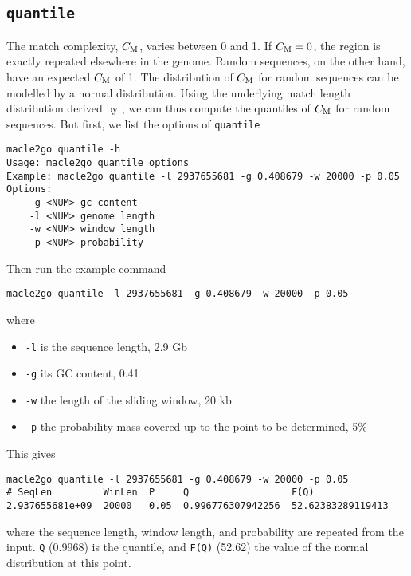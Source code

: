 \documentclass[a4paper]{article}
\newcommand{\ty}{\texttt}
\newcommand{\cm}{C_{\rm M}}
\begin{document}
\subsection{\ty{quantile}} The match complexity, $\cm$, varies between 0 and 1. If $\cm=0$, the region is
exactly repeated elsewhere in the genome. Random sequences, on the
other hand, have an expected $\cm$ of 1. The distribution of $\cm$ for
random sequences can be modelled by a normal distribution. Using the
underlying match length distribution derived by \cite{hau09:est}, we
can thus 
compute the quantiles of $\cm$ for random sequences. But first, we list the options of \ty{quantile}
\begin{lstlisting}
macle2go quantile -h
Usage: macle2go quantile options
Example: macle2go quantile -l 2937655681 -g 0.408679 -w 20000 -p 0.05
Options:
	-g <NUM> gc-content
	-l <NUM> genome length
	-w <NUM> window length
	-p <NUM> probability
\end{lstlisting}
Then run the example command
\begin{verbatim}
macle2go quantile -l 2937655681 -g 0.408679 -w 20000 -p 0.05
\end{verbatim}
where
\begin{itemize}
\item \ty{-l} is the sequence length, 2.9 Gb
\item \ty{-g} its GC content, 0.41
\item \ty{-w} the length of the sliding window, 20 kb
\item \ty{-p} the probability mass covered up to the point to be determined, 5\%
\end{itemize}
This gives
\begin{verbatim}
macle2go quantile -l 2937655681 -g 0.408679 -w 20000 -p 0.05
# SeqLen         WinLen  P     Q                  F(Q)
2.937655681e+09  20000   0.05  0.996776307942256  52.62383289119413
\end{verbatim}
where the sequence length, window length, and probability are repeated
from the input. \ty{Q} (0.9968) is the quantile, and \ty{F(Q)} (52.62) the value of the
normal distribution at this point.
\end{document}
